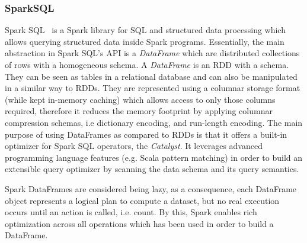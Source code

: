 \subsubsection{SparkSQL}
Spark SQL~\cite{Armbrust2015SSR} is a Spark library for SQL and structured data processing which allows querying structured data inside Spark programs.
Essentially, the main abstraction in Spark SQL’s API is a \textit{DataFrame} which are distributed collections of rows with a homogeneous schema.
A \textit{DataFrame} is an \gls{RDD} with a schema.
They can be seen as tables in a relational database and can also be manipulated in a similar way to \gls{RDD}s.
They are represented using a columnar storage format (while kept in-memory caching) which allows access to only those columns required, therefore it reduces the memory footprint by applying columnar compression schemas, i.e dictionary encoding, and run-length encoding.
The main purpose of using DataFrames as compared to \gls{RDD}s is that it offers a built-in optimizer for Spark SQL operators, the \textit{Catalyst}.
It leverages advanced programming language features (e.g. Scala pattern matching) in order to build an extensible query optimizer by scanning the data schema and its query semantics.

Spark DataFrames are considered being lazy, as a consequence, each DataFrame object represents a logical plan to compute a dataset, but no real execution occurs until an action is called, i.e. count.
By this, Spark enables rich optimization across all operations which has been used in order to build a DataFrame.


